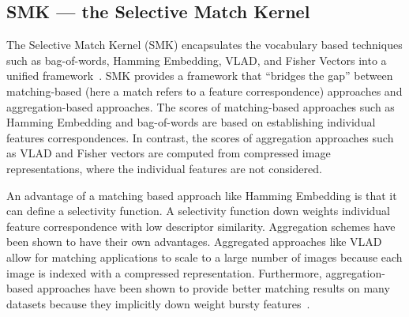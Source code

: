     \subsection{SMK --- the Selective Match Kernel}\label{sec:smk}
        The Selective Match Kernel (SMK) encapsulates the vocabulary based techniques such as bag-of-words, Hamming
        Embedding, VLAD, and Fisher Vectors into a unified framework~\cite{bo_efficient_2009, tolias_aggregate_2013,
        tolias_image_2015, jegou_triangulation_2014}. SMK provides a framework that ``bridges the gap'' between
        matching-based (here a match refers to a feature correspondence) approaches and aggregation-based approaches.
        The scores of matching-based approaches such as Hamming Embedding and bag-of-words are based on establishing
        individual features correspondences. In contrast, the scores of aggregation approaches such as VLAD and Fisher
        vectors are computed from compressed image representations, where the individual features are not considered.

        An advantage of a matching based approach like Hamming Embedding is that it can define a selectivity function. A
        selectivity function down weights individual feature correspondence with low descriptor similarity. Aggregation
        schemes have been shown to have their own advantages. Aggregated approaches like VLAD allow for matching
        applications to scale to a large number of images because each image is indexed with a compressed
        representation. Furthermore, aggregation-based approaches have been shown to provide better matching results on
        many datasets because they implicitly down weight bursty features~\cite{tolias_aggregate_2013,
        tolias_image_2015}.




